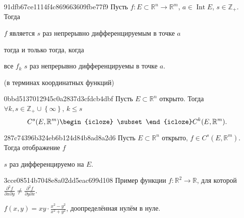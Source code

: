 \begin{note}{91dfb67ce1114f4c869663609fbe77f9}
    Пусть \({ f : E \subset \mathbb R^{n} \to \mathbb R^{m} }\),\: \({ a \in \operatorname{Int} E }\),\: \({ s \in \mathbb Z_+ }\).
    Тогда \begin{icloze}{2}\({ f }\) является \({ s }\) раз непрерывно дифференцируемым в точке \({ a }\)\end{icloze} \begin{icloze}{3}тогда и только тогда, когда\end{icloze} \begin{icloze}{1}все \({ f_k }\) \({ s }\) раз непрерывно дифференцируемы в точке \({ a }\).\end{icloze}

    \begin{center}
        \tiny
        (в терминах координатных функций)
    \end{center}
\end{note}

\begin{note}{0bbd5137012945c0a2837d3cfdcb4dbf}
    Пусть \({ E \subset \mathbb R^{n} }\) открыто.
    Тогда \({ \forall k,  s \in \mathbb Z_+ \cup \left\{ \infty \right\} }\),\: \({ k \leqslant s }\)
    \[
        C^{s}(E, \mathbb R^{m}) \begin{icloze}{1}\subset\end{icloze} C^{k}(E, \mathbb R^{m}).
    \]
\end{note}

\begin{note}{287c74396b324eb6b124d84b8ad8a2d6}
    Пусть \({ E \subset \mathbb R^{n} }\) открыто, \({ f \in C^{s}(E, \mathbb R^{m}) }\).
    Тогда отображение \({ f }\) \begin{icloze}{1}\({ s }\) раз дифференцируемо на \({ E }\).\end{icloze}
\end{note}

\begin{note}{3cce08514b7048e8a02dd5eac699d108}
    Пример функции \({ f : \mathbb R^2 \to \mathbb R }\), для которой \({ \frac{\partial^2 f}{\partial x \partial y} \neq \frac{\partial^2 f}{\partial y \partial x} }\).

    \begin{cloze}{1}
        \({ f(x, y) = xy \cdot \frac{x^2 - y^2}{x^2 + y^2} }\), доопределённая нулём в нуле.
    \end{cloze}
\end{note}

